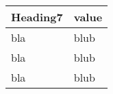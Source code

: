   \begin{tabular}[t]{ll}
    Heading7 & value \\
    \midrule
    bla & blub \\
    bla & blub \\
    bla & blub \\
  \end{tabular}